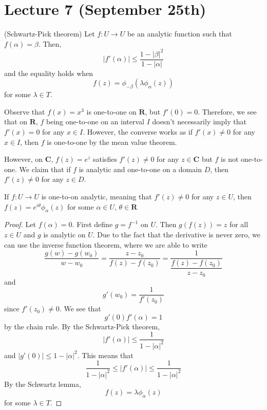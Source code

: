 \section{Lecture 7 (September 25th)}
\begin{thm}
(Schwartz-Pick theorem) Let $f:U\rightarrow U$ be an analytic function such that $f(\alpha )=\beta $. Then,
\[|f'(\alpha )|\leq \dfrac{1-|\beta |^2}{1-|\alpha |}\]
and the equality holds when 
\[f(z)=\phi _{-\beta }(\lambda \phi _{\alpha }(z))\]
for some $\lambda \in T$. 
\end{thm}
\vspace{2ex}
\begin{ex}
Observe that $f(x)=x^3$ is one-to-one on ${\bm R}$, but $f'(0)=0$. Therefore, we see that on ${\bm R}$, $f$ being one-to-one on an interval $I$ doesn't necessarily imply that $f'(x)=0$ for any $x\in I$. However, the converse works as if $f'(x)\ne 0$ for any $x\in I$, then $f$ is one-to-one by the mean value theorem.

\bigksip

However, on ${\bm C}$, $f(z)=e^{z}$ satisfies $f'(z)\ne 0$ for any $z\in {\bm C}$ but $f$ is not one-to-one. We claim that if $f$ is analytic and one-to-one on a domain $D$, then $f'(z)\ne 0$ for any $z\in D$.
\end{ex}
\vspace{2ex}
\begin{thm}
If $f:U\rightarrow U$ is one-to-on analytic, meaning that $f'(z)\ne 0$ for any $z\in U$, then $f(z)=e^{i\theta }\phi _{\alpha }(z)$ for some $\alpha \in U$, $\theta \in {\bm R}$
\end{thm}
\vspace{2ex}
\begin{proof}
Let $f(\alpha )=0$. First define $g=f^{-1}$ on $U$. Then $g(f(z))=z$ for all $z\in U$ and $g$ is analytic on $U$. Due to the fact that the derivative is never zero, we can use the inverse function theorem, where we are able to write
\[\dfrac{g(w)-g(w_0)}{w-w_0}=\dfrac{z-z_0}{f(z)-f(z_0)}=\dfrac{1}{\dfrac{f(z)-f(z_0)}{z-z_0}}\]
and
\[g'(w_0)=\dfrac{1}{f'(z_0)}\]
since $f'(z_0)\ne 0$. We see that
\[g'(0)f'(\alpha )=1\]
by the chain rule. By the Schwartz-Pick theorem,
\[|f'(\alpha )|\leq \dfrac{1}{1-|\alpha |^2}\]
and $|g'(0)|\leq 1-|\alpha |^2$. This means that 
\[\dfrac{1}{1-|\alpha |^2}\leq |f'(\alpha )|\leq \dfrac{1}{1-|\alpha |^2}\]
By the Schwartz lemma,
\[f(z)=\lambda \phi _{\alpha }(z)\]
for some $\lambda \in T$. 
\end{proof}
\vspace{2ex}
